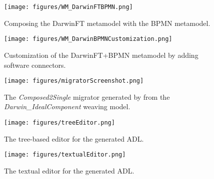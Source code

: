 \begin{figure*}[ht]
    \begin{center}
    \texttt{[image: figures/WM\_DarwinFTBPMN.png]}
    \caption{Composing the DarwinFT metamodel with the BPMN metamodel.}\label{fig:WM_DarwinFTBPMN}
    \end{center}
\end{figure*}


\begin{figure*}[ht]
    \begin{center}
    \texttt{[image: figures/WM\_DarwinBPMNCustomization.png]}
    \caption{Customization of the DarwinFT+BPMN metamodel by adding software connectors.}\label{fig:WM_DarwinBPMNCustomization}
    \end{center}
\end{figure*}

\begin{figure*}[ht]
    \begin{center}
    \texttt{[image: figures/migratorScreenshot.png]}
    \caption{The \textit{Composed2Single} migrator generated by \name{} from the \textit{Darwin\_IdealComponent} weaving model.}\label{fig:migratorScreenshot}
    \end{center}
\end{figure*}

\begin{figure*}[ht]
    \begin{center}
    \texttt{[image: figures/treeEditor.png]}
    \caption{The tree-based editor for the generated ADL.}\label{fig:treeEditor}
    \end{center}
\end{figure*}

\begin{figure*}[ht]
    \begin{center}
    \texttt{[image: figures/textualEditor.png]}
    \caption{The textual editor for the generated ADL.}\label{fig:textualEditor}
    \end{center}
\end{figure*}


